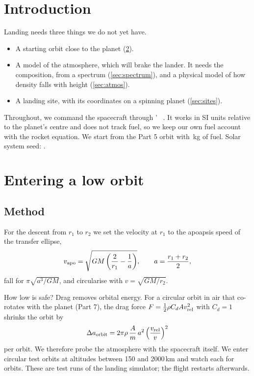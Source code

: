 \documentclass[aps,prd,twocolumn,nofootinbib,floatfix,superscriptaddress]{revtex4-2}
\begin{document}
\section{Introduction}
Landing needs three things we do not yet have.
\begin{itemize}
\item A starting orbit close to the planet (\cref{sec:low}).
\item A model of the atmosphere, which will brake the lander. It needs the composition, from a spectrum (\cref{sec:spectrum}), and a physical model of how density falls with height (\cref{sec:atmos}).
\item A landing site, with its coordinates on a spinning planet (\cref{sec:sites}).
\end{itemize}
Throughout, we command the spacecraft through ' ~\cite{ast2000tools}.
It works in SI units relative to the planet's centre and does not track fuel, so we keep our own fuel account with the rocket equation.
We start from the Part 5 orbit with \,kg of fuel.
Solar system seed: .

\section{Entering a low orbit}\label{sec:low}
\subsection{Method}
For the descent from $r_1$ to $r_2$ we set the velocity at $r_1$ to the apoapsis speed of the transfer ellipse,
\begin{equation}
  v_{\rm apo}=\sqrt{GM\left(\frac{2}{r_1}-\frac{1}{a}\right)},\qquad a=\frac{r_1+r_2}{2},
\end{equation}
fall for $\pi\sqrt{a^3/GM}$, and circularise with $v=\sqrt{GM/r_2}$.

How low is safe?
Drag removes orbital energy.
For a circular orbit in air that co-rotates with the planet (Part 7), the drag force $F=\tfrac12\rho C_dAv_{\rm rel}^2$ with $C_d=1$ shrinks the orbit by
\begin{equation}
  \Delta a_{\rm orbit}=2\pi\rho\,\frac{A}{m}\,a^2\left(\frac{v_{\rm rel}}{v}\right)^2 \label{eq:decay}
\end{equation}
per orbit.
We therefore probe the atmosphere with the spacecraft itself.
We enter circular test orbits at  altitudes between 150 and 2000\,km and watch each for  orbits.
These are test runs of the landing simulator; the flight restarts afterwards.
\end{document}
